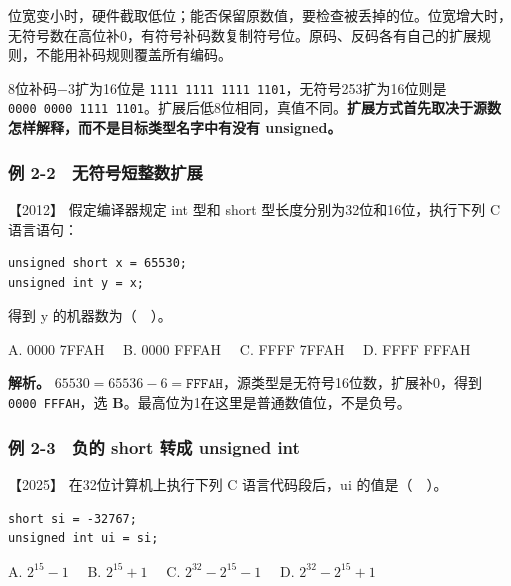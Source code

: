 位宽变小时，硬件截取低位；能否保留原数值，要检查被丢掉的位。位宽增大时，无符号数在高位补0，有符号补码数复制符号位。原码、反码各有自己的扩展规则，不能用补码规则覆盖所有编码。

8位补码−3扩为16位是 \texttt{1111\ 1111\ 1111\ 1101}，无符号253扩为16位则是 \texttt{0000\ 0000\ 1111\ 1101}。扩展后低8位相同，真值不同。\textbf{扩展方式首先取决于源数怎样解释，而不是目标类型名字中有没有 unsigned。}

\subsubsection{例 2-2　无符号短整数扩展}\label{co-ex2-2}

\noindent{}【2012】 假定编译器规定 int 型和 short 型长度分别为32位和16位，执行下列 C 语言语句：

\par\medskip\noindent
\begin{minipage}{\linewidth}
\begin{verbatim}
unsigned short x = 65530;
unsigned int y = x;
\end{verbatim}
\end{minipage}\par\medskip

得到 y 的机器数为（　）。

A. 0000 7FFAH　 B. 0000 FFFAH　 C. FFFF 7FFAH　 D. FFFF FFFAH


\textbf{解析。} \(65530=65536-6=\mathtt{FFFAH}\)，源类型是无符号16位数，扩展补0，得到 \texttt{0000\ FFFAH}，选 \textbf{B}。最高位为1在这里是普通数值位，不是负号。

\subsubsection{例 2-3　负的 short 转成 unsigned int}\label{co-ex2-3}

\noindent{}【2025】 在32位计算机上执行下列 C 语言代码段后，ui 的值是（　）。

\par\medskip\noindent
\begin{minipage}{\linewidth}
\begin{verbatim}
short si = -32767;
unsigned int ui = si;
\end{verbatim}
\end{minipage}\par\medskip

A. \(2^{15}-1\)　 B. \(2^{15}+1\)　 C. \(2^{32}-2^{15}-1\)　 D. \(2^{32}-2^{15}+1\)

